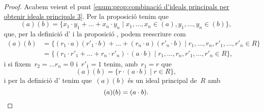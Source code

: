 \documentclass[../../main.tex]{subfiles}
\begin{document}
\begin{proposition}
\begin{proof}
            Acabem veient el punt \eqref{enum:prop:combinació d'ideals principals per obtenir ideals principals 3}.
            Per la proposició  tenim que
            \[
                (a)(b)=\{x_{1}\cdot y_{1}+\dots+x_{n}\cdot y_{n}\mid x_{1},\dots,x_{n}\in(a),y_{1},\dots,y_{n}\in(b)\},
            \]
            que, per la definició d' i la proposició , podem reescriure com
            \begin{align*}
            (a)(b)&=\{(r_{1}\cdot a)(r'_{1}\cdot b)+\dots+(r_{n}\cdot a)(r'_{n}\cdot b)\mid r_{1},\dots,r_{n},r'_{1},\dots,r'_{n}\in R\}\\
            &=\{(r_{1}\cdot r'_{1}+\dots+r_{n}\cdot r'_{n})\cdot(a\cdot b)\mid r_{1},\dots,r_{n},r'_{1},\dots,r'_{n}\in R\},
            \end{align*}
            i si fixem~\(r_{2}=\dots r_{n}=0\) i~\(r'_{1}=1\) tenim, amb~\(r_{1}=r\) que
            \[
                (a)(b)=\{r\cdot(a\cdot b)\mid r\in R\},
            \]
            i per la definició d' tenim que~\((a)(b)\) és un ideal principal de~\(R\) amb
            \[
                (a)(b)=(a\cdot b).\qedhere
            \]
        \end{proof}
    \end{proposition}
\end{document}
